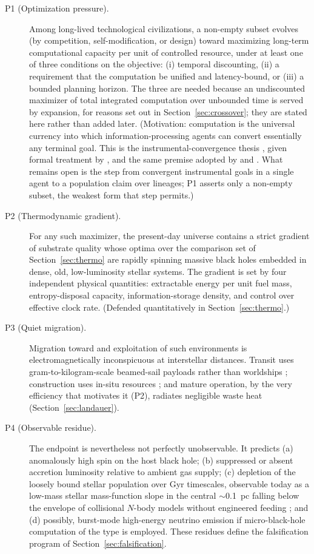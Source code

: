 \documentclass[11pt]{article}
\begin{document}
\begin{description}
\item[P1 (Optimization pressure).] Among long-lived technological civilizations, a non-empty subset evolves (by competition, self-modification, or design) toward maximizing long-term computational capacity per unit of controlled resource, under at least one of three conditions on the objective: (i) temporal discounting, (ii) a requirement that the computation be unified and latency-bound, or (iii) a bounded planning horizon. The three are needed because an undiscounted maximizer of total integrated computation over unbounded time is served by expansion, for reasons set out in Section~\ref{sec:crossover}; they are stated here rather than added later. (Motivation: computation is the universal currency into which information-processing agents can convert essentially any terminal goal. This is the instrumental-convergence thesis \citep{Omohundro2008,Bostrom2012}, given formal treatment by \citet{BensonTilsenSoares2016}, and the same premise adopted by \citealt{Smart2012} and \citealt{Sandberg2016}. What remains open is the step from convergent instrumental goals in a single agent to a population claim over lineages; P1 asserts only a non-empty subset, the weakest form that step permits.)

\item[P2 (Thermodynamic gradient).] For any such maximizer, the present-day universe contains a strict gradient of substrate quality whose optima over the comparison set of Section~\ref{sec:thermo} are rapidly spinning massive black holes embedded in dense, old, low-luminosity stellar systems. The gradient is set by four independent physical quantities: extractable energy per unit fuel mass, entropy-disposal capacity, information-storage density, and control over effective clock rate. (Defended quantitatively in Section~\ref{sec:thermo}.)

\item[P3 (Quiet migration).] Migration toward and exploitation of such environments is electromagnetically inconspicuous at interstellar distances. Transit uses gram-to-kilogram-scale beamed-sail payloads rather than worldships \citep{Lubin2016}; construction uses in-situ resources \citep{Freitas1982}; and mature operation, by the very efficiency that motivates it (P2), radiates negligible waste heat (Section~\ref{sec:landauer}).

\item[P4 (Observable residue).] The endpoint is nevertheless not perfectly unobservable. It predicts (a) anomalously high spin on the host black hole; (b) suppressed or absent accretion luminosity relative to ambient gas supply; (c) depletion of the loosely bound stellar population over Gyr timescales, observable today as a low-mass stellar mass-function slope in the central $\sim$0.1~pc falling below the envelope of collisional $N$-body models without engineered feeding \citep{GonzalezPrieto2025}; and (d) possibly, burst-mode high-energy neutrino emission if micro-black-hole computation of the \citet{Dvali2023} type is employed. These residues define the falsification program of Section~\ref{sec:falsification}.
\end{description}
\end{document}
